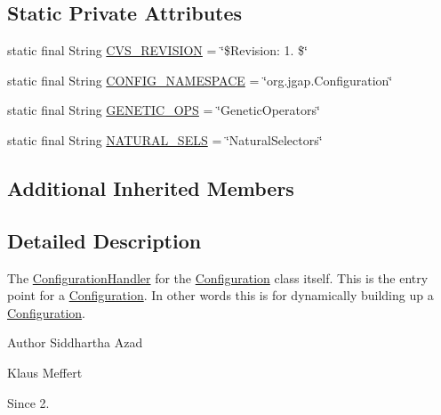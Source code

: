 \subsection*{Static Private Attributes}
\begin{DoxyCompactItemize}
\item 
static final String \hyperlink{classorg_1_1jgap_1_1data_1_1config_1_1_root_configuration_handler_a450bd9651df5506c2650986e211a54d6}{C\-V\-S\-\_\-\-R\-E\-V\-I\-S\-I\-O\-N} = \char`\"{}\$Revision\-: 1. \$\char`\"{}
\item 
static final String \hyperlink{classorg_1_1jgap_1_1data_1_1config_1_1_root_configuration_handler_a0860e45eacb4498af65851fd0b1ac7fc}{C\-O\-N\-F\-I\-G\-\_\-\-N\-A\-M\-E\-S\-P\-A\-C\-E} = \char`\"{}org.\-jgap.\-Configuration\char`\"{}
\item 
static final String \hyperlink{classorg_1_1jgap_1_1data_1_1config_1_1_root_configuration_handler_a93ca2e0367ff5f34c81dccbd91d36cb5}{G\-E\-N\-E\-T\-I\-C\-\_\-\-O\-P\-S} = \char`\"{}Genetic\-Operators\char`\"{}
\item 
static final String \hyperlink{classorg_1_1jgap_1_1data_1_1config_1_1_root_configuration_handler_aaa4a3397aaa566ff34c7aa421b4527dc}{N\-A\-T\-U\-R\-A\-L\-\_\-\-S\-E\-L\-S} = \char`\"{}Natural\-Selectors\char`\"{}
\end{DoxyCompactItemize}
\subsection*{Additional Inherited Members}


\subsection{Detailed Description}
The \hyperlink{interfaceorg_1_1jgap_1_1data_1_1config_1_1_configuration_handler}{Configuration\-Handler} for the \hyperlink{classorg_1_1jgap_1_1_configuration}{Configuration} class itself. This is the entry point for a \hyperlink{classorg_1_1jgap_1_1_configuration}{Configuration}. In other words this is for dynamically building up a \hyperlink{classorg_1_1jgap_1_1_configuration}{Configuration}.

\begin{DoxyAuthor}{Author}
Siddhartha Azad 

Klaus Meffert 
\end{DoxyAuthor}
\begin{DoxySince}{Since}
2. 
\end{DoxySince}


